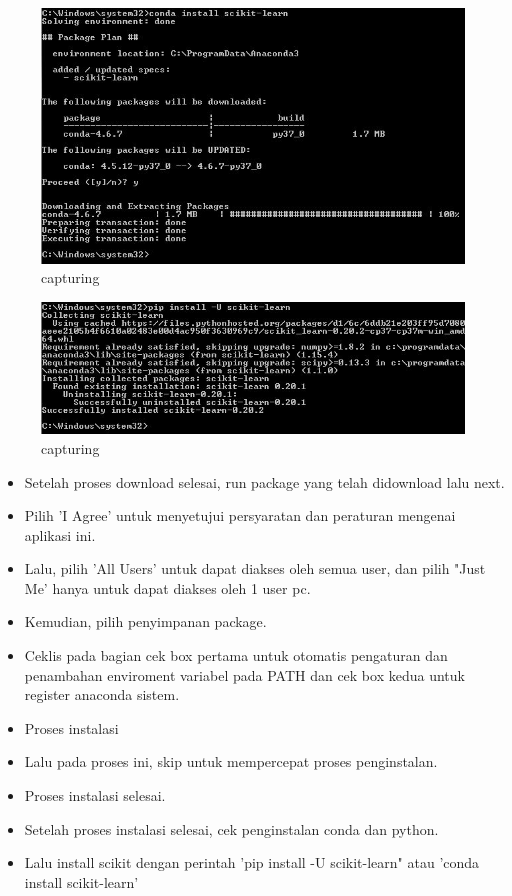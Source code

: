 \begin{enumerate}
\begin{itemize}
\begin{figure}[ht]
\centering
\includegraphics[scale=0.5]{figures/11.jpg}
\caption{capturing}
\label{proses instalasi}
\end{figure}

\begin{figure}[ht]
\centering
\includegraphics[scale=0.5]{figures/12.jpg}
\caption{capturing}
\label{proses instalasi}
\end{figure}

\begin{itemize}

\item Setelah proses download selesai, run package yang telah didownload lalu next.
\item Pilih 'I Agree' untuk menyetujui persyaratan dan peraturan mengenai aplikasi ini.
\item Lalu, pilih 'All Users' untuk dapat diakses oleh semua user, dan pilih "Just Me' hanya untuk dapat diakses oleh 1 user pc.
\item Kemudian, pilih penyimpanan package.
\item Ceklis pada bagian cek box pertama untuk otomatis pengaturan dan penambahan enviroment variabel pada PATH dan cek box kedua untuk register anaconda sistem.
\item Proses instalasi
\item Lalu pada proses ini, skip untuk mempercepat proses penginstalan.
\item Proses instalasi selesai.
\item Setelah proses instalasi selesai, cek penginstalan conda dan python.
\item Lalu install scikit dengan perintah 'pip install -U scikit-learn" atau 'conda install scikit-learn'
\end{itemize}


\end{itemize}
\end{enumerate}
